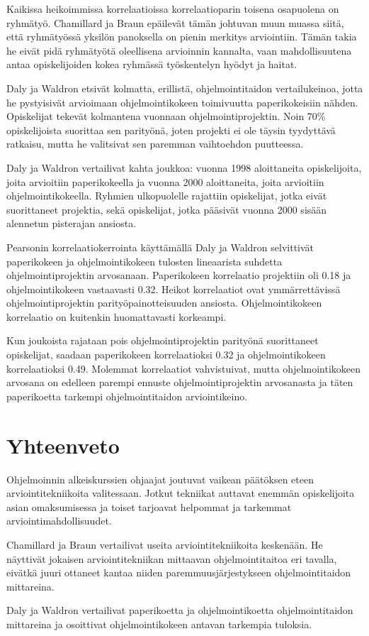 \documentclass[finnish]{../tktltiki2}
\theoremstyle{definition}
\theoremstyle{remark}
\begin{document}
Kaikissa heikoimmissa korrelaatioissa korrelaatioparin toisena osapuolena on ryhmätyö. Chamillard ja Braun epäilevät tämän johtuvan muun muassa siitä, että ryhmätyössä yksilön panoksella on pienin merkitys arviointiin. Tämän takia he eivät pidä ryhmätyötä oleellisena arvioinnin kannalta, vaan mahdollisuutena antaa opiskelijoiden kokea ryhmässä työskentelyn hyödyt ja haitat.

Daly ja Waldron etsivät kolmatta, erillistä, ohjelmointitaidon vertailukeinoa, jotta he pystyisivät arvioimaan ohjelmointikokeen toimivuutta paperikokeisiin nähden. Opiskelijat tekevät kolmantena vuonnaan ohjelmointiprojektin. Noin 70\% opiskelijoista suorittaa sen parityönä, joten projekti ei ole täysin tyydyttävä ratkaisu, mutta he valitsivat sen paremman vaihtoehdon puutteessa.

Daly ja Waldron vertailivat kahta joukkoa: vuonna 1998 aloittaneita opiskelijoita, joita arvioitiin paperikokeella ja vuonna 2000 aloittaneita, joita arvioitiin ohjelmointikokeella. Ryhmien ulkopuolelle rajattiin opiskelijat, jotka eivät suorittaneet projektia, sekä opiskelijat, jotka pääsivät vuonna 2000 sisään alennetun pisterajan ansiosta.

Pearsonin korrelaatiokerrointa käyttämällä Daly ja Waldron selvittivät paperikokeen ja ohjelmointikokeen tulosten lineaarista suhdetta ohjelmointiprojektin arvosanaan. Paperikokeen korrelaatio projektiin oli 0.18 ja ohjelmointikokeen vastaavasti 0.32. Heikot korrelaatiot ovat ymmärrettävissä ohjelmointiprojektin parityöpainotteisuuden ansiosta. Ohjelmointikokeen korrelaatio on kuitenkin huomattavasti korkeampi.

Kun joukoista rajataan pois ohjelmointiprojektin parityönä suorittaneet opiskelijat, saadaan paperikokeen korrelaatioksi 0.32 ja ohjelmointikokeen korrelaatioksi 0.49. Molemmat korrelaatiot vahvistuivat, mutta ohjelmointikokeen arvosana on edelleen parempi ennuste ohjelmointiprojektin arvosanasta ja täten paperikoetta tarkempi ohjelmointitaidon arviointikeino.

\section{Yhteenveto}

Ohjelmoinnin alkeiskurssien ohjaajat joutuvat vaikean päätöksen eteen arviointitekniikoita valitessaan. Jotkut tekniikat auttavat enemmän opiskelijoita asian omaksumisessa ja toiset tarjoavat helpommat ja tarkemmat arviointimahdollisuudet.

Chamillard ja Braun vertailivat useita arviointitekniikoita keskenään. He näyttivät jokaisen arviointitekniikan mittaavan ohjelmointitaitoa eri tavalla, eivätkä juuri ottaneet kantaa niiden paremmuusjärjestykseen ohjelmointitaidon mittareina.

Daly ja Waldron vertailivat paperikoetta ja ohjelmointikoetta ohjelmointitaidon mittareina ja osoittivat ohjelmointikokeen antavan tarkempia tuloksia.





\end{document}
